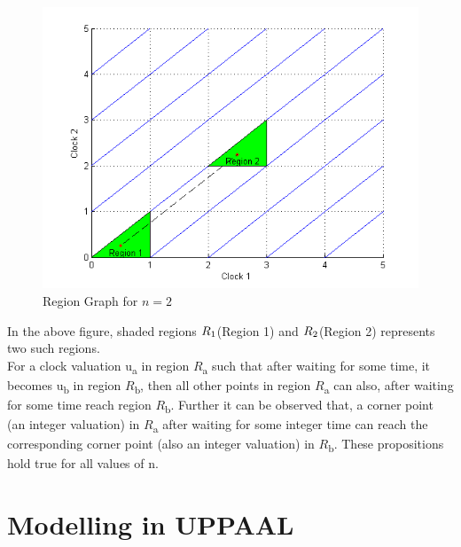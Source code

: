 \documentclass[12pt,letterpaper]{report}
\begin{document}
\begin{figure}[h!]
\begin{center}

\includegraphics[scale=0.7]{regiongraph.png}
\caption{Region Graph for $n=2$}
\end{center}
\end{figure} 

In the above figure, shaded regions $R\textsubscript{1}$(Region 1) and $R\textsubscript{2}$(Region 2) represents two such regions.
\\
 For a clock valuation u\textsubscript{a} in region $R$\textsubscript{a} such that after waiting for some time, it becomes u\textsubscript{b} in region  $R$\textsubscript{b}, then all other points in region $R$\textsubscript{a} can also, after waiting for some time reach region $R$\textsubscript{b}. Further it can be observed that, a corner point (an integer valuation) in $R$\textsubscript{a} after waiting for some integer time can reach the corresponding corner point (also an integer valuation) in $R$\textsubscript{b}. These propositions hold true for all values of n.      

\section{Modelling in UPPAAL}
  
\end{document}
